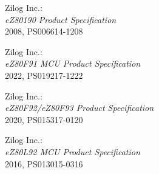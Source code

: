  Zilog Inc.: \\
               {\em eZ80190 Product Specification\/} \\
               2008, PS006614-1208

 Zilog Inc.: \\
               {\em eZ80F91 MCU Product Specification\/} \\
               2022, PS019217-1222

 Zilog Inc.: \\
               {\em eZ80F92/eZ80F93 Product Specification\/} \\
               2020, PS015317-0120

 Zilog Inc.: \\
               {\em eZ80L92 MCU Product Specification\/} \\
               2016, PS013015-0316

